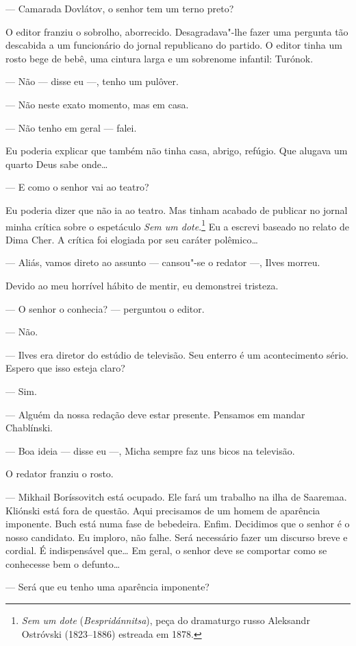 --- Camarada Dovlátov, o senhor tem um terno preto?

O editor franziu o sobrolho, aborrecido. Desagradava"-lhe fazer uma
pergunta tão descabida a um funcionário do jornal republicano do
partido. O editor tinha um rosto bege de bebê, uma cintura larga e um
sobrenome infantil: Turónok.

--- Não --- disse eu ---, tenho um pulôver.

--- Não neste exato momento, mas em casa.

--- Não tenho em geral --- falei.

Eu poderia explicar que também não tinha casa, abrigo, refúgio. Que
alugava um quarto Deus sabe onde\ldots{}

--- E como o senhor vai ao teatro?

Eu poderia dizer que não ia ao teatro. Mas tinham acabado de publicar no
jornal minha crítica sobre o espetáculo \emph{Sem um dote}.\footnote{\emph{Sem
  um dote} (\emph{Bespridánnitsa}), peça do dramaturgo russo Aleksandr
  Ostróvski (1823--1886) estreada em 1878.} Eu a escrevi baseado no
relato de Dima Cher. A crítica foi elogiada por seu caráter
polêmico\ldots{}

--- Aliás, vamos direto ao assunto --- cansou"-se o redator ---, Ilves
morreu.

Devido ao meu horrível hábito de mentir, eu demonstrei tristeza.

--- O senhor o conhecia? --- perguntou o editor.

--- Não.

--- Ilves era diretor do estúdio de televisão. Seu enterro é um
acontecimento sério. Espero que isso esteja claro?

--- Sim.

--- Alguém da nossa redação deve estar presente. Pensamos em mandar
Chablínski.

--- Boa ideia --- disse eu ---, Micha sempre faz uns bicos na televisão.

O redator franziu o rosto.

--- Mikhail Boríssovitch está ocupado. Ele fará um trabalho na ilha de
Saaremaa. Kliónski está fora de questão. Aqui precisamos de um homem de
aparência imponente. Buch está numa fase de bebedeira. Enfim. Decidimos
que o senhor é o nosso candidato. Eu imploro, não falhe. Será necessário
fazer um discurso breve e cordial. É indispensável que\ldots{} Em geral, o
senhor deve se comportar como se conhecesse bem o defunto\ldots{}

--- Será que eu tenho uma aparência imponente?

